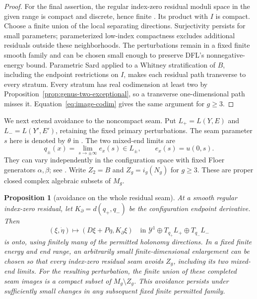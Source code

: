 \documentclass[11pt]{amsart}
\newtheorem{proposition}[theorem]{Proposition}
\theoremstyle{definition}
\theoremstyle{remark}
\theoremstyle{plain}
\begin{document}
\begin{proof}
For the final assertion, the regular index-zero residual moduli
space in the given range is compact and discrete, hence finite
\cite[Proposition~3.26]{DaeFukLip21a}. Its product with $I$
is compact. Choose a finite union of the local separating
directions. Surjectivity persists for small parameters;
parameterized low-index compactness excludes additional
residuals outside these neighborhoods. The perturbations
remain in a fixed finite smooth family and can be chosen
small enough to preserve DFL's nonnegative-energy bound.
Parametric Sard applied to a Whitney stratification of $B$,
including the endpoint restrictions on $I$, makes each
residual path transverse to every stratum. Every stratum
has real codimension at least two by
Proposition~\ref{prop:genus-two-exceptional}, so a transverse
one-dimensional path misses it. Equation~\eqref{eq:image-codim}
gives the same argument for $g\geq3$.
\end{proof}

We next extend avoidance to the noncompact seam. Put
$L_+=L(Y,E)$ and $L_-=L(Y',E')$, retaining the fixed primary
perturbations. The seam parameter $s$ here is denoted by $\theta$
in \cite{DaeFukLip21a}. The two mixed-end limits are
\begin{equation}\label{eq:mixed-end-evaluation}
 q_\pm(x)=\lim_{s\to\pm\infty}e_x(s)\in L_\pm,
 \qquad e_x(s)=u(0,s).
\end{equation}
They can vary independently in the configuration space with fixed
Floer generators $\alpha,\beta$; see
\cite[Proposition~3.6(iii) and the following configuration
definition]{DaeFukLip21a}. Write
$Z_2=B$ and $Z_g=i_g(N_g)$ for $g\geq3$.
These are proper closed complex algebraic subsets of $M_g$.

\begin{proposition}[avoidance on the whole residual seam]
\label{prop:global-residual-avoidance}
At a smooth regular index-zero residual, let
$K_\partial=d(q_+,q_-)$ be the configuration endpoint derivative.
Then
\begin{equation}\label{eq:augmented-end-evaluation}
 (\xi,\dot\eta)\longmapsto
 (D\xi+P\dot\eta,K_\partial\xi)
 \quad\text{in }\mathcal Y^1\oplus
       T_{q_+}L_+\oplus T_{q_-}L_-
\end{equation}
is onto, using finitely many of the permitted holonomy directions.
In a fixed finite energy and end range, an arbitrarily small
finite-dimensional enlargement can be chosen so that every
index-zero residual seam avoids $Z_g$, including its two mixed-end
limits. For the resulting perturbation, the finite union of these
completed seam images is a compact subset of $M_g\setminus Z_g$.
This avoidance persists under sufficiently small changes in any
subsequent fixed finite permitted family.
\end{proposition}
\end{document}
